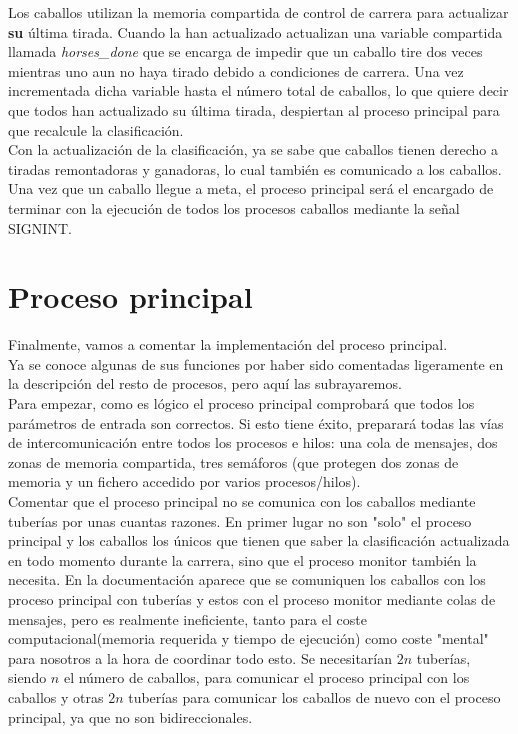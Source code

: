 \documentclass[12pt]{article}
\begin{document}
Los caballos utilizan la memoria compartida de control de carrera para actualizar \textbf{su} última tirada. Cuando la han actualizado actualizan una variable compartida llamada \emph{horses\_done} que se encarga de impedir que un caballo tire dos veces mientras uno aun no haya tirado debido a condiciones de carrera. Una vez incrementada dicha variable hasta el número total de caballos, lo que quiere decir que todos han actualizado su última tirada, despiertan al proceso principal para que recalcule la clasificación.\\

Con la actualización de la clasificación, ya se sabe que caballos tienen derecho a tiradas remontadoras y ganadoras, lo cual también es comunicado a los caballos.\\

Una vez que un caballo llegue a meta, el proceso principal será el encargado de terminar con la ejecución de todos los procesos caballos mediante la señal SIGNINT.\\

\section{Proceso principal}
Finalmente, vamos a comentar la implementación del proceso principal.\\

Ya se conoce algunas de sus funciones por haber sido comentadas ligeramente en la descripción del resto de procesos, pero aquí las subrayaremos.\\

Para empezar, como es lógico el proceso principal comprobará que todos los parámetros de entrada son correctos. Si esto tiene éxito, preparará todas las vías de intercomunicación entre todos los procesos e hilos: una cola de mensajes, dos zonas de memoria compartida, tres semáforos (que protegen dos zonas de memoria y un fichero accedido por varios procesos/hilos).\\

Comentar que el proceso principal no se comunica con los caballos mediante tuberías por unas cuantas razones. En primer lugar no son "solo" el proceso principal y los caballos los únicos que tienen que saber la clasificación actualizada en todo momento durante la carrera, sino que el proceso monitor también la necesita. En la documentación aparece que se comuniquen los caballos con los proceso principal con tuberías y estos con el proceso monitor mediante colas de mensajes, pero es realmente ineficiente, tanto para el coste computacional(memoria requerida y tiempo de ejecución) como coste "mental" para nosotros a la hora de coordinar todo esto. Se necesitarían $2n$ tuberías, siendo $n$ el número de caballos, para comunicar el proceso principal con los caballos y otras $2n$ tuberías para comunicar los caballos de nuevo con el proceso principal, ya que no son bidireccionales.\\
\end{document}
